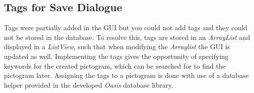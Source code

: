 \subsection{Tags for Save Dialogue}
Tags were partially added in the GUI but you could not add tags and they could not be stored in the database.
To resolve this, tags are stored in an \textit{ArrayList} and displayed in a \textit{ListView}, such that when modifying the \textit{Arraylist} the GUI is updated as well.
Implementing the tags gives the opportunity of specifying keywords for the created pictogram, which can be searched for to find the pictogram later.
Assigning the tags to a pictogram is done with use of a database helper provided in the developed \textit{Oasis} database library.